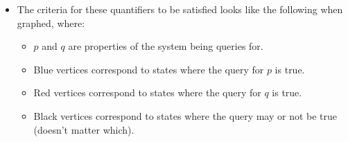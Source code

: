 \documentclass{article}
\begin{document}
\begin{itemize}
\begin{enumerate}
\begin{itemize}
		\end{itemize}
	\end{enumerate}
	\item The criteria for these quantifiers to be satisfied looks like the following when graphed, where:
	\begin{itemize}
		\item $p$ and $q$ are properties of the system being queries for.
		\item Blue vertices correspond to states where the query for $p$ is true.
		\item Red vertices correspond to states where the query for $q$ is true.
		\item Black vertices correspond to states where the query may or not be true (doesn't matter which).
	\end{itemize}
\end{itemize}

\vspace{1em}



\newcommand{\treecoords}{
	\coordinate (N0)  at ( 0.0,  0.0);
	\coordinate (N1)  at (-1.2, -1.0);
	\coordinate (N2)  at ( 1.2, -1.0);
	\coordinate (N3)  at (-1.8, -2.0);
	\coordinate (N4)  at (-0.6, -2.0);
	\coordinate (N5)  at ( 0.6, -2.0);
	\coordinate (N6)  at ( 1.8, -2.0);
	\coordinate (N7)  at (-2.1, -3.0);
	\coordinate (N8)  at (-1.5, -3.0);
	\coordinate (N9)  at (-0.9, -3.0);
	\coordinate (N10) at (-0.3, -3.0);
	\coordinate (N11) at ( 0.3, -3.0);
	\coordinate (N12) at ( 0.9, -3.0);
	\coordinate (N13) at ( 1.5, -3.0);
	\coordinate (N14) at ( 2.1, -3.0);
}

\newcommand{\treebg}{
	(0, 0.30) -- (-2.45, -3.25) -- (2.45, -3.25) -- cycle;
}

\newcommand{\treeedges}{
	\foreach \p/\c in
		{0/1,0/2,1/3,1/4,2/5,2/6,3/7,3/8,4/9,4/10,5/11,5/12,6/13,6/14}{
		\draw[eg] (N\p) -- (N\c);
	}
}

\newcommand{\allblack}{
	\foreach \i in {0,...,14}{ \node[nd] at (N\i) {}; }
}

\end{document}
